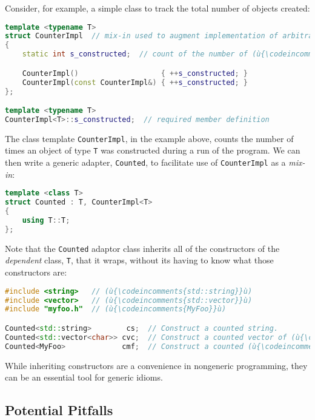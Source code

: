 Consider, for example, a simple class to track the total number of
objects created:

\begin{lstlisting}[language=C++]
template <typename T>
struct CounterImpl  // mix-in used to augment implementation of arbitrary type
{
    static int s_constructed;  // count of the number of (ù{\codeincomments{T}}ù) objects constructed

    CounterImpl()                   { ++s_constructed; }
    CounterImpl(const CounterImpl&) { ++s_constructed; }
};

template <typename T>
CounterImpl<T>::s_constructed;  // required member definition
\end{lstlisting}
    
\noindent The class template \texttt{CounterImpl}, in the example above, counts the number of
times an object of type \texttt{T} was constructed during a run of the
program. We can then write a generic adapter, \texttt{Counted}, to
facilitate use of \texttt{CounterImpl} as a \emph{mix-in}:

\begin{lstlisting}[language=C++]
template <class T>
struct Counted : T, CounterImpl<T>
{
    using T::T;
};
\end{lstlisting}
    
\noindent Note that the \texttt{Counted} adaptor class inherits all of the
constructors of the \emph{dependent} class, \texttt{T}, that it wraps,
without its having to know what those constructors are:

\begin{lstlisting}[language=C++]
#include <string>   // (ù{\codeincomments{std::string}}ù)
#include <vector>   // (ù{\codeincomments{std::vector}}ù)
#include "myfoo.h"  // (ù{\codeincomments{MyFoo}}ù)

Counted<std::string>        cs;  // Construct a counted string.
Counted<std::vector<char>> cvc;  // Construct a counted vector of (ù{\codeincomments{char}}ù).
Counted<MyFoo>             cmf;  // Construct a counted (ù{\codeincomments{MyFoo}}ù) object.
\end{lstlisting}
    
\noindent While inheriting constructors are a convenience in nongeneric
programming, they can be an essential tool for generic idioms.

\subsection[Potential Pitfalls]{Potential Pitfalls}\label{potential-pitfalls-ctorinheriting}

